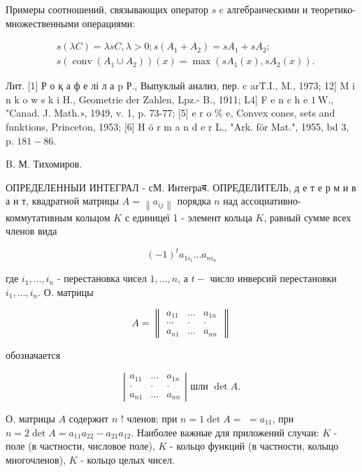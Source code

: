 \documentclass[10pt]{article}
\begin{document}
Примеры соотношений, связывающих оператор $s$ c алгебраическими и теоретико-множественными операциями:

\[
\begin{aligned}
& s(\lambda C)=\lambda s C, \lambda>0 ; s\left(A_{1}+A_{2}\right)=s A_{1}+s A_{2} ; \\
& s\left(\operatorname{conv}\left(A_{1} \cup A_{2}\right)\right)(x)=\max \left(s A_{1}(x), s A_{2}(x)\right) .
\end{aligned}
\]

Лит. [1] Р о қ а ф е лі л а p Р., Выпуклый анализ, пер. c arT.I., M., 1973; 12] M i n k o w s k i H., Geometrie der Zahlen, Lpz.- B., 1911; L4] F e n c $\mathrm{h}$ e $1 \mathrm{~W}$., "Canad. J. Math.», 1949, v. 1, p. 73-77; [5] e r o \% e, Convex cones, sets and funktions, Princeton, 1953; [6] H ö r m a n d e r L., "Ark. för Mat.", 1955, bd 3, p. $181-86$.

B. М. Тихомиров.

ОПРЕДЕЛЕННЫИ ИНТЕГРАЛ - сМ. Интеграब. ОПРЕДЕЛИТЕЛЬ, д е т е р м и в а н т, квадратной матрицы $A=\left\|a_{i j}\right\|$ порядка $n$ над ассоциативно-коммутативным кольцом $K$ с единицеї 1 - элемент кольца $K$, равный сумме всех членов вида

\[
(-1)^{t} a_{1 i_{1}} \ldots a_{n i_{n}}
\]

где $i_{1}, \ldots, i_{n}$ - перестановка чисел $1, \ldots, n$, а $t-$ число инверсий перестановки $i_{1}, \ldots, i_{n}$. О. матрицы

\[
A=\left\|\begin{array}{ccc}
a_{11} & \ldots & a_{1 n} \\
\cdots & \cdot & \cdot \\
a_{n 1} & \ldots & a_{n n}
\end{array}\right\|
\]

обозначается

\[
\left|\begin{array}{ccc}
a_{11} & \ldots & a_{1 n} \\
\cdot & \cdot & \cdot \\
a_{n 1} & \ldots & a_{n n}
\end{array}\right| \text { шли } \operatorname{det} A .
\]

О. матрицы $A$ содержит $n$ ! членов; при $n=1 \operatorname{det} A=$ $=a_{11}$, при $n=2 \operatorname{det} A=a_{11} a_{22}-a_{21} a_{12}$. Наиболее важные для приложений случаи: $K$ - поле (в частности, числовое поле), $K$ - кольцо функций (в частности, колыцо многочленов), $K$ - кольцо целых чисел.
\end{document}
